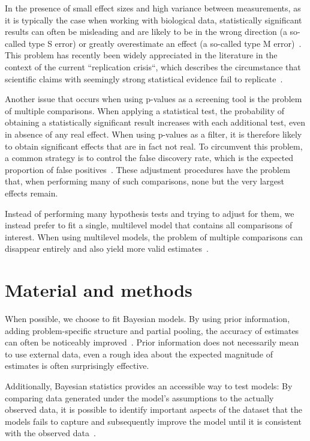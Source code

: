 \documentclass[fleqn,11pt]{SelfArx} %
\begin{document}
In the presence of small effect sizes and high variance between measurements, as  it is typically the case when working with biological data, statistically significant results can often be misleading and are likely to be in the wrong direction (a so-called type S error) or greatly overestimate an effect (a so-called type M error)~\cite{Gelman2014}. This problem has recently been widely appreciated in the literature in the context of the current “replication crisis“, which describes the circumstance that scientific claims with seemingly strong statistical evidence fail to replicate~\cite{Ioannidis2005}.

Another issue that occurs when using p-values as a screening tool is the problem of multiple comparisons. When applying a statistical test, the probability  of  obtaining a statistically significant result increases with each additional test, even in absence of any real effect. When using p-values as a filter, it is therefore likely to obtain significant effects that are in fact not real. To circumvent this problem, a common strategy is to control the false discovery rate, which is the expected proportion of false positives~\cite{Benjamini1995}. These adjustment procedures have the problem that, when performing many of such comparisons, none but the very largest effects remain.

Instead of performing many hypothesis tests and trying to adjust for them, we instead prefer to fit a single, multilevel model that contains all comparisons of interest. When using multilevel models, the problem of multiple comparisons can disappear entirely and  also yield more valid estimates~\cite{Gelman2012}.

\section{Material and methods}

When possible, we choose to fit Bayesian models. By using prior information, adding problem-specific structure and partial pooling, the accuracy of estimates can often be noticeably improved~\cite{Gelman2010}. Prior information does not necessarily mean to use external data, even a rough idea about the expected magnitude of estimates is often surprisingly effective.

Additionally, Bayesian statistics provides an accessible way to test models: By comparing data generated under the model's assumptions to the actually observed data, it is possible to identify important aspects of the dataset that the models fails to capture and subsequently improve the model until it is consistent with the observed data~\cite{Gabry2019}.
\end{document}
